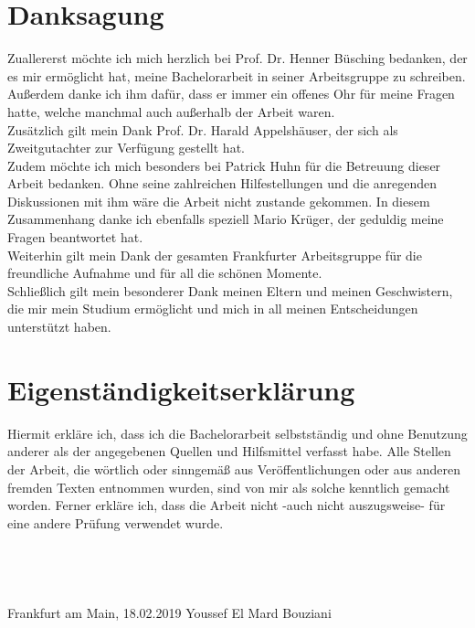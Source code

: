 \documentclass[12pt,a4paper]{report}
\begin{document}
\cleardoublepage
{}





\chapter*{Danksagung}
Zuallererst möchte ich mich herzlich bei Prof. Dr. Henner Büsching bedanken, der es mir ermöglicht hat, meine Bachelorarbeit in seiner Arbeitsgruppe zu schreiben. Außerdem danke ich ihm dafür, dass er immer ein offenes Ohr für meine Fragen hatte, welche manchmal auch außerhalb der Arbeit waren.\\
Zusätzlich gilt mein Dank Prof. Dr. Harald Appelshäuser, der sich als Zweitgutachter zur Verfügung gestellt hat.\\
Zudem möchte ich mich besonders bei Patrick Huhn für die Betreuung dieser Arbeit bedanken. Ohne seine zahlreichen Hilfestellungen und die anregenden Diskussionen mit ihm wäre die Arbeit nicht zustande gekommen. In diesem Zusammenhang danke ich ebenfalls speziell Mario Krüger, der geduldig meine Fragen beantwortet hat.\\
Weiterhin gilt mein Dank der gesamten Frankfurter Arbeitsgruppe für die freundliche Aufnahme und für all die schönen Momente.\\
Schließlich gilt mein besonderer Dank meinen Eltern und meinen Geschwistern, die mir mein Studium ermöglicht und mich in all meinen Entscheidungen unterstützt haben.
\nocite{alice}
\chapter*{Eigenständigkeitserklärung}
Hiermit erkläre ich, dass ich die Bachelorarbeit selbstständig und ohne Benutzung anderer als der angegebenen Quellen und Hilfsmittel verfasst habe. Alle Stellen der Arbeit, die wörtlich oder sinngemäß aus Veröffentlichungen oder aus anderen fremden Texten entnommen wurden, sind von mir als solche kenntlich gemacht worden. Ferner erkläre ich, dass die Arbeit nicht -auch nicht auszugsweise- für eine andere Prüfung verwendet wurde.\\ \\ \\ \\ \\ 
\hspace*{1cm}  Frankfurt am Main, 18.02.2019   \hspace*{2cm}   Youssef El Mard Bouziani

\chapter*{}
\end{document}
